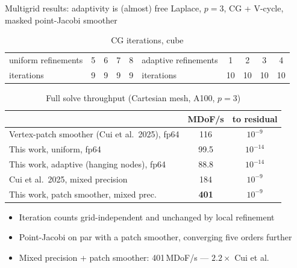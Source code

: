 \documentclass{beamer}
\begin{document}
\begin{frame}{Multigrid results: adaptivity is (almost) free}
    \small
    Laplace, $p=3$, CG + V-cycle, masked point-Jacobi smoother
    \vspace{-0.5em}
    \begin{table}
        \centering
        \caption{CG iterations, cube}
        \scriptsize
        \begin{tabular}{lcccc|lcccc}
            \toprule
            uniform refinements & 5 & 6 & 7 & 8 & adaptive refinements & 1  & 2  & 3  & 4  \\
            iterations          & 9 & 9 & 9 & 9 & iterations           & 10 & 10 & 10 & 10 \\
            \bottomrule
        \end{tabular}
    \end{table}
    \vspace{-0.8em}
    \begin{table}
        \centering
        \caption{Full solve throughput (Cartesian mesh, A100, $p=3$)}
        \scriptsize
        \begin{tabular}{lcc}
            \toprule
                                                           & \textbf{MDoF/s}      & to residual        \\
            \midrule
            Vertex-patch smoother (Cui et al.\ 2025), fp64 & 116                  & $10^{-9}$          \\
            This work, uniform, fp64                       & 99.5                 & \alert{$10^{-14}$} \\
            This work, adaptive (hanging nodes), fp64      & 88.8                 & \alert{$10^{-14}$} \\
            \midrule
            Cui et al.\ 2025, mixed precision              & 184                  & $10^{-9}$          \\
            \alert{This work, patch smoother, mixed prec.} & \alert{\textbf{401}} & $10^{-9}$          \\
            \bottomrule
        \end{tabular}
    \end{table}
    \vspace{-1.1em}
    \begin{itemize}
        \footnotesize
        \setlength{\itemsep}{0.15em}
        \item Iteration counts grid-independent and \alert{unchanged} by local refinement
        \item Point-Jacobi on par with a patch smoother, converging five orders further
        \item \alert{Mixed precision + patch smoother: 401\,MDoF/s} --- $2.2\times$ Cui et al.
    \end{itemize}
\end{frame}
\end{document}
